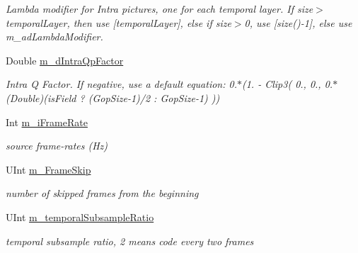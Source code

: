\begin{DoxyCompactItemize}
\begin{DoxyCompactList}\small\item\em Lambda modifier for Intra pictures, one for each temporal layer. If size$>$temporal\+Layer, then use \mbox{[}temporal\+Layer\mbox{]}, else if size$>$0, use \mbox{[}size()-\/1\mbox{]}, else use m\+\_\+ad\+Lambda\+Modifier. \end{DoxyCompactList}\item 
\mbox{\label{class_t_app_enc_cfg_af6ba18acbc7a9f7f9b0cd126cbfb1cb1}} 
Double \hyperlink{class_t_app_enc_cfg_af6ba18acbc7a9f7f9b0cd126cbfb1cb1}{m\+\_\+d\+Intra\+Qp\+Factor}
\begin{DoxyCompactList}\small\item\em Intra Q Factor. If negative, use a default equation\+: 0.$\ast$(1. -\/ Clip3( 0., 0., 0.$\ast$(Double)(is\+Field ? (Gop\+Size-\/1)/2 \+: Gop\+Size-\/1) )) \end{DoxyCompactList}\item 
\mbox{\label{class_t_app_enc_cfg_a9efeb83bb6ea9053a6713d8e8eb41444}} 
Int \hyperlink{class_t_app_enc_cfg_a9efeb83bb6ea9053a6713d8e8eb41444}{m\+\_\+i\+Frame\+Rate}
\begin{DoxyCompactList}\small\item\em source frame-\/rates (Hz) \end{DoxyCompactList}\item 
\mbox{\label{class_t_app_enc_cfg_a899c90cf36c7dc23a238aab6b3e5dda5}} 
U\+Int \hyperlink{class_t_app_enc_cfg_a899c90cf36c7dc23a238aab6b3e5dda5}{m\+\_\+\+Frame\+Skip}
\begin{DoxyCompactList}\small\item\em number of skipped frames from the beginning \end{DoxyCompactList}\item 
\mbox{\label{class_t_app_enc_cfg_a9047e7fd19f3da19a3ba84f81617bf5b}} 
U\+Int \hyperlink{class_t_app_enc_cfg_a9047e7fd19f3da19a3ba84f81617bf5b}{m\+\_\+temporal\+Subsample\+Ratio}
\begin{DoxyCompactList}\small\item\em temporal subsample ratio, 2 means code every two frames \end{DoxyCompactList}\item 
\mbox{\label{class_t_app_enc_cfg_a269c94d738aae7f91b2f37984359bdc3}} 

\end{DoxyCompactItemize}
